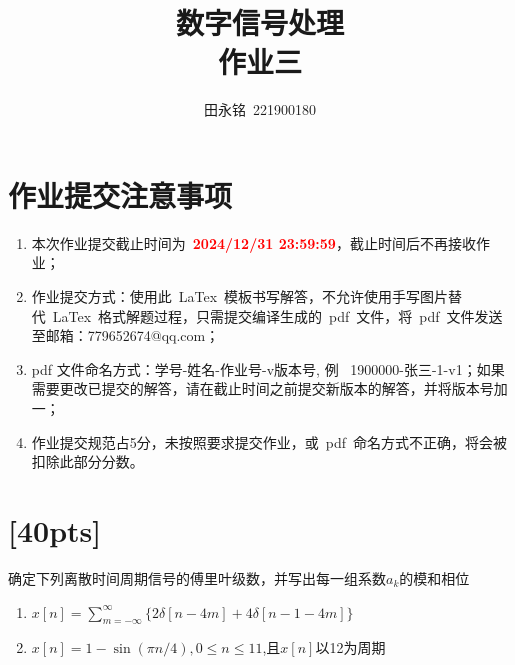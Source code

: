 \documentclass[a4paper,UTF8]{article}
\numberwithin{equation}{section}
\begin{document}
\title{数字信号处理\\
    作业三}
\author{田永铭\, 221900180}
\maketitle

\section*{作业提交注意事项}
\begin{tcolorbox}
    \begin{enumerate}
       \item[(1)] 本次作业提交截止时间为~\textcolor{red}{\textbf{2024/12/31  23:59:59}}，截止时间后不再接收作业；
        \item[(2)] 作业提交方式：使用此~LaTex~模板书写解答，不允许使用手写图片替代~LaTex~格式解题过程，只需提交编译生成的~pdf~文件，将~pdf~文件发送至邮箱：779652674@qq.com；
        \item[(3)] pdf 文件命名方式：学号-姓名-作业号-v版本号, 例~ 1900000-张三-1-v1；如果需要更改已提交的解答，请在截止时间之前提交新版本的解答，并将版本号加一；
        \item[(4)] 作业提交规范占5分，未按照要求提交作业，或~pdf~命名方式不正确，将会被扣除此部分分数。
    \end{enumerate}
\end{tcolorbox}

\newpage
\section{[40pts]}
确定下列离散时间周期信号的傅里叶级数，并写出每一组系数$a_{k}$的模和相位
\begin{enumerate}[(1)]
    \item $x[n]=\sum\limits_{m=-\infty}^{\infty}\{2\delta{[n-4m]}+4\delta{[n-1-4m]}\}$
    \item $x[n]=1-\sin{(\pi n/4)},0\le n\le 11$,且$x[n]$以12为周期
\end{enumerate}
\end{document}
